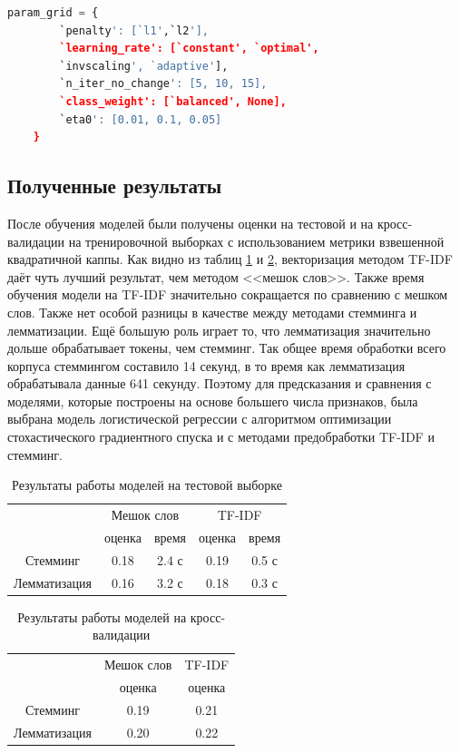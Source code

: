 \documentclass[14pt]{mmcs_article}
\begin{document}
\begin{lstlisting}[language=Python, caption={Python, сетка параметров}, label=text:lst1]
	param_grid = {
		`penalty': [`l1',`l2'],
		`learning_rate': [`constant', `optimal', 
		`invscaling', `adaptive'],
		`n_iter_no_change': [5, 10, 15],
		`class_weight': [`balanced', None],
		`eta0': [0.01, 0.1, 0.05]
	}
\end{lstlisting}


\subsection{Полученные результаты}

После обучения моделей были получены оценки на тестовой и на кросс-валидации на тренировочной выборках с использованием метрики взвешенной квадратичной каппы. Как видно из таблиц \ref{text:table1} и \ref{text:table2}, векторизация методом TF-IDF даёт чуть лучший результат, чем методом <<мешок слов>>. Также время обучения модели на TF-IDF значительно сокращается по сравнению с мешком слов. Также нет особой разницы в качестве между методами стемминга и лемматизации. Ещё большую роль играет то, что лемматизация значительно дольше обрабатывает токены, чем стемминг. Так общее время обработки всего корпуса стеммингом составило 14 секунд, в то время как лемматизация обрабатывала данные 641 секунду. Поэтому для предсказания и сравнения с моделями, которые построены на основе большего числа признаков, была выбрана модель логистической регрессии с алгоритмом оптимизации стохастического градиентного спуска и с методами предобработки TF-IDF и стемминг.

 \begin{table}[H]
 	\centering
 	\caption{Результаты работы моделей на тестовой выборке}\label{text:table1}
 	\begin{tabular}{ccccc}
 		\hline
 			& \multicolumn{2}{c}{Мешок слов} & \multicolumn{2}{c}{TF-IDF} \\
 		& оценка & время & оценка & время \\
 		\hline
 		Стемминг & 0.18 & 2.4 с & 0.19 & 0.5 с \\
 		Лемматизация & 0.16 & 3.2 с & 0.18 & 0.3 с \\
 		\hline
 	\end{tabular}
 \end{table}

 \begin{table}[H]
	\centering
	\caption{Результаты работы моделей на кросс-валидации}\label{text:table2}
	\begin{tabular}{ccc}
		\hline
		& Мешок слов & TF-IDF \\
		& оценка & оценка\\
		\hline
		Стемминг & 0.19 & 0.21 \\
		Лемматизация & 0.20 & 0.22 \\
		\hline
	\end{tabular}
\end{table}
\end{document}
